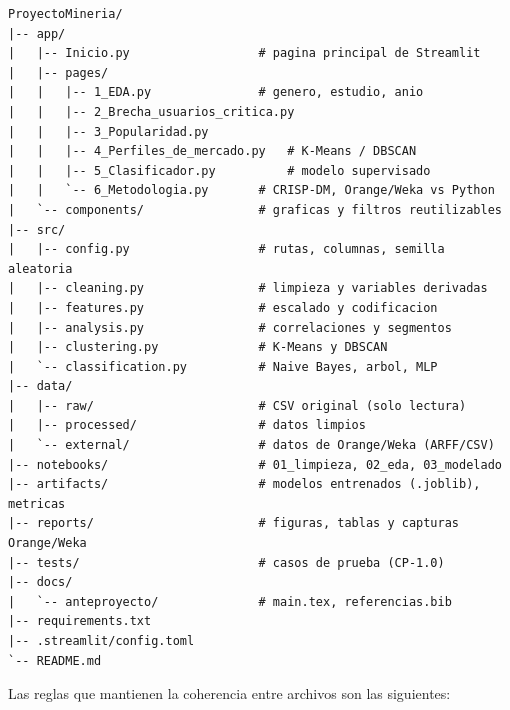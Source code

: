 \documentclass[letterpaper,11pt]{article}
\begin{document}
\begin{lstlisting}[style=output,basicstyle=\ttfamily\footnotesize]
ProyectoMineria/
|-- app/
|   |-- Inicio.py                  # pagina principal de Streamlit
|   |-- pages/
|   |   |-- 1_EDA.py               # genero, estudio, anio
|   |   |-- 2_Brecha_usuarios_critica.py
|   |   |-- 3_Popularidad.py
|   |   |-- 4_Perfiles_de_mercado.py   # K-Means / DBSCAN
|   |   |-- 5_Clasificador.py          # modelo supervisado
|   |   `-- 6_Metodologia.py       # CRISP-DM, Orange/Weka vs Python
|   `-- components/                # graficas y filtros reutilizables
|-- src/
|   |-- config.py                  # rutas, columnas, semilla aleatoria
|   |-- cleaning.py                # limpieza y variables derivadas
|   |-- features.py                # escalado y codificacion
|   |-- analysis.py                # correlaciones y segmentos
|   |-- clustering.py              # K-Means y DBSCAN
|   `-- classification.py          # Naive Bayes, arbol, MLP
|-- data/
|   |-- raw/                       # CSV original (solo lectura)
|   |-- processed/                 # datos limpios
|   `-- external/                  # datos de Orange/Weka (ARFF/CSV)
|-- notebooks/                     # 01_limpieza, 02_eda, 03_modelado
|-- artifacts/                     # modelos entrenados (.joblib), metricas
|-- reports/                       # figuras, tablas y capturas Orange/Weka
|-- tests/                         # casos de prueba (CP-1.0)
|-- docs/
|   `-- anteproyecto/              # main.tex, referencias.bib
|-- requirements.txt
|-- .streamlit/config.toml
`-- README.md
\end{lstlisting}

Las reglas que mantienen la coherencia entre archivos son las siguientes:
\end{document}
